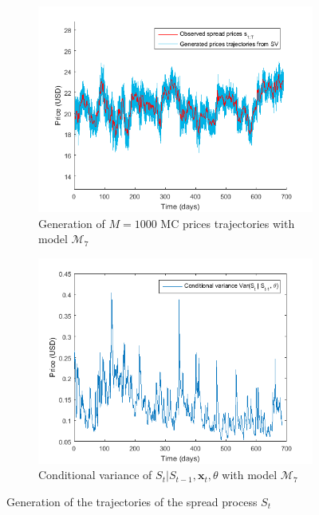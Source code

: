 \documentclass[11pt,a4,twosided,singlespacing,titlepagenumber=on]{scrreprt}
\numberwithin{equation}{chapter} %
\theoremstyle{remark}
\newcommand{\matr}[1]{\mathbf{#1}}
\begin{document}
\begin{figure}[H]
    \centering
    \begin{subfigure}[t]{0.49\textwidth}
        \centering
        \includegraphics[width=1\textwidth]{model_vol/1}
        \caption{Generation of $M = 1000$ MC prices trajectories with model $\mathcal{M}_7$}
        \label{vol_mod_1}
    \end{subfigure}
    \begin{subfigure}[t]{0.49\textwidth}
        \centering
        \includegraphics[width=1\textwidth]{model_vol/2}
        \caption{Conditional variance of $S_t | S_{t-1}, \matr{x}_t, \theta$ with model $\mathcal{M}_7$}
        \label{vol_mod_2}
    \end{subfigure}
    \caption{Generation of the trajectories of the spread process $S_t$}
    \label{fig:generation_of_the_trajectories}
\end{figure}
\end{document}
